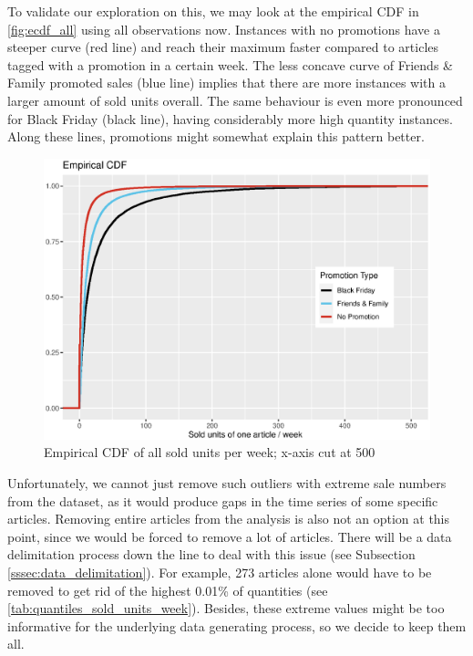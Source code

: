 To validate our exploration on this, we may look at the empirical \ac{CDF} in \autoref{fig:ecdf_all} using all observations now.
Instances with no promotions have a steeper curve (red line) and reach their maximum faster compared to articles tagged with a promotion in a certain week. The less concave curve of Friends \& Family promoted sales (blue line) implies that there are more instances with a larger amount of sold units overall. The same behaviour is even more pronounced for Black Friday (black line), having considerably more high quantity instances. Along these lines, promotions might somewhat explain this pattern better.\\
 
 
 \begin{figure}[H]
\centering
  \includegraphics[width=0.65\linewidth]{figures/ecdf_all.eps}
  \caption{Empirical \ac{CDF} of all sold units per week; x-axis cut at 500}
  \label{fig:ecdf_all}
\end{figure}



Unfortunately, we cannot just remove such outliers with extreme sale numbers from the dataset, as it would produce gaps in the time series of some specific articles. Removing entire articles from the analysis is also not an option at this point, since we would be forced to remove a lot of articles. There will be a data delimitation process down the line to deal with this issue (see Subsection \ref{sssec:data_delimitation}). For example, 273 articles alone would have to be removed to get rid of the highest 0.01\% of quantities (see \autoref{tab:quantiles_sold_units_week}). Besides, these extreme values might be too informative for the underlying data generating process, so we decide to keep them all.








